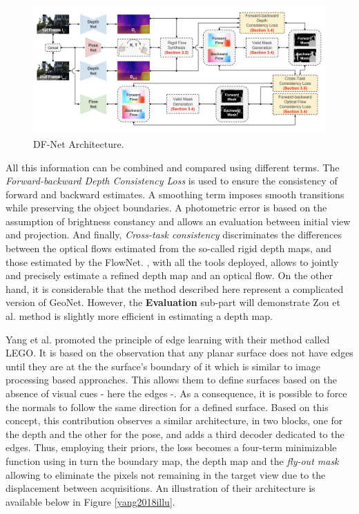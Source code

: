 \begin{figure}[h]
	\centering
	\includegraphics[width=0.8\linewidth]{Figures/SOA/illuzhou2018.png}
	\caption[DF-Net Architecture.]{DF-Net \cite{zou2018df} Architecture.}
	\label{illuzhou2018}
\end{figure}

 
All this information can be combined and compared using different terms. The \emph{Forward-backward Depth Consistency Loss} is used to ensure the consistency of forward and backward estimates. A smoothing term imposes smooth transitions while preserving the object boundaries. A photometric error is based on the assumption of brightness constancy and allows an evaluation between initial view and projection. And finally, \emph{Cross-task consistency} discriminates the differences between the optical flows estimated from the so-called rigid depth maps, and those estimated by the FlowNet. 
\cite{zou2018df}, with all the tools deployed, allows to jointly and precisely estimate a refined depth map and an optical flow. On the other hand, it is considerable that the method described here represent a complicated version of GeoNet. However, the \textbf{Evaluation} sub-part will demonstrate Zou et al. \cite{zou2018df} method is slightly more efficient in estimating a depth map.


Yang et al. \cite{yang2018lego} promoted the principle of edge learning with their method called LEGO. It is based on the observation that any planar surface does not have edges until they are at the the surface's boundary of it which is similar to image processing based approaches. This allows them to define surfaces based on the absence of visual cues - here the edges -. As a consequence, it is possible to force the normals to follow the same direction for a defined surface. Based on this concept, this contribution observes a similar architecture, in two blocks, one for the depth and the other for the pose, and adds a third decoder dedicated to the edges.
Thus, employing their priors, the loss becomes a four-term minimizable function using in turn the boundary map, the depth map and the \emph{fly-out mask} allowing to eliminate the pixels not remaining in the target view due to the displacement between acquisitions. An illustration of their architecture is available below in Figure \ref{yang2018illu}.


